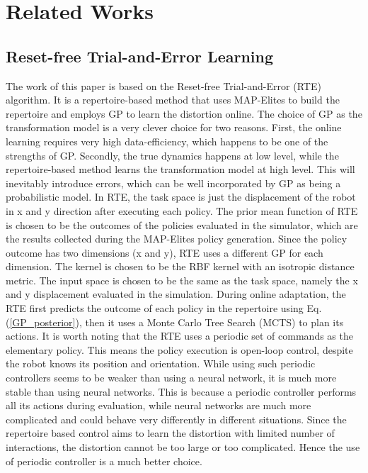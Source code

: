 \section{Related Works}

\subsection{Reset-free Trial-and-Error Learning}
The work of this paper is based on the Reset-free Trial-and-Error \cite{RTE} (RTE) algorithm. 
It is a repertoire-based method that uses MAP-Elites to build the repertoire and employs GP to learn the distortion online.
The choice of GP as the transformation model is a very clever choice for two reasons.
First, the online learning requires very high data-efficiency, which happens to be one of the strengths of GP. 
Secondly, the true dynamics happens at low level, while the repertoire-based method learns the transformation model at high level. This will inevitably introduce errors, which can be well incorporated by GP as being a probabilistic model.
In RTE, the task space is just the displacement of the robot in x and y direction after executing each policy.
The prior mean function of RTE is chosen to be the outcomes of the policies evaluated in the simulator, which are the results collected during the MAP-Elites policy generation. 
Since the policy outcome has two dimensions (x and y), RTE uses a different GP for each dimension.
The kernel is chosen to be the RBF kernel with an isotropic distance metric. The input space is chosen to be the same as the task space, namely the x and y displacement evaluated in the simulation. 
During online adaptation, the RTE first predicts the outcome of each policy in the repertoire using Eq. (\ref{GP_posterior}), then it uses a Monte Carlo Tree Search \cite{MCTS} (MCTS) to plan its actions.
It is worth noting that the RTE uses a periodic set of commands as the elementary policy. 
This means the policy execution is open-loop control, despite the robot knows its position and orientation.
While using such periodic controllers seems to be weaker than using a neural network, it is much more stable than using neural networks. 
This is because a periodic controller performs all its actions during evaluation, while neural networks are much more complicated and could behave very differently in different situations.
Since the repertoire based control aims to learn the distortion with limited number of interactions, the distortion cannot be too large or too complicated. Hence the use of periodic controller is a much better choice. 


